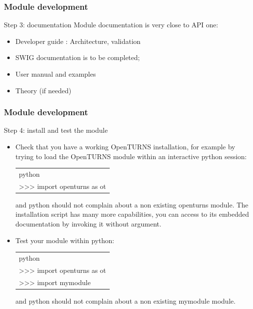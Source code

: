 \documentclass[8pt]{beamer}
\begin{document}
\begin{frame}
  \frametitle{Module development}
  \begin{block}{Step 3: documentation}
    Module documentation is very close to API one:
    \begin{itemize}
    \item Developer guide : Architecture, validation
    \item SWIG documentation is to be completed;
    \item User manual and examples
    \item Theory (if needed)
    \end{itemize}
  \end{block}
\end{frame}


\begin{frame}
  \frametitle{Module development}
  \begin{block}{Step 4: install and test the module}
    \begin{itemize}
    \item Check that you have a working OpenTURNS installation, for example by trying to load the OpenTURNS module within an interactive python session:
      \begin{tabular}{l}
        \ttfamily python\\
        \ttfamily >>> import openturns as ot\\
      \end{tabular}

      and python should not complain about a non existing openturns module.
      The installation script has many more capabilities, you can access to its embedded documentation by invoking it without argument.
    \item Test your module within python:\\
      \begin{tabular}{l}
        \ttfamily python \\
        \ttfamily >>> import openturns as ot \\
        \ttfamily >>> import mymodule \\
      \end{tabular}

      and python should not complain about a non existing mymodule module.
    \end{itemize}
  \end{block}
\end{frame}
\end{document}
